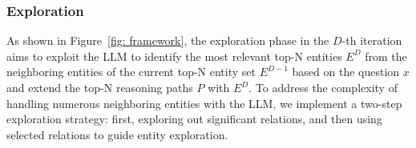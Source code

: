 \subsubsection{Exploration}
As shown in Figure~\ref{fig: framework}, the exploration phase in the $D$-th iteration aims to exploit the LLM to identify the most relevant top-N entities $E^{D}$ from the neighboring entities of the current top-N entity set $E^{D-1}$ based on the question $x$ and extend the top-N reasoning paths $P$ with $E^{D}$.
To address the complexity of handling numerous neighboring entities with the LLM, we implement a two-step exploration strategy: first, exploring out significant relations, and then using selected relations to guide entity exploration.




